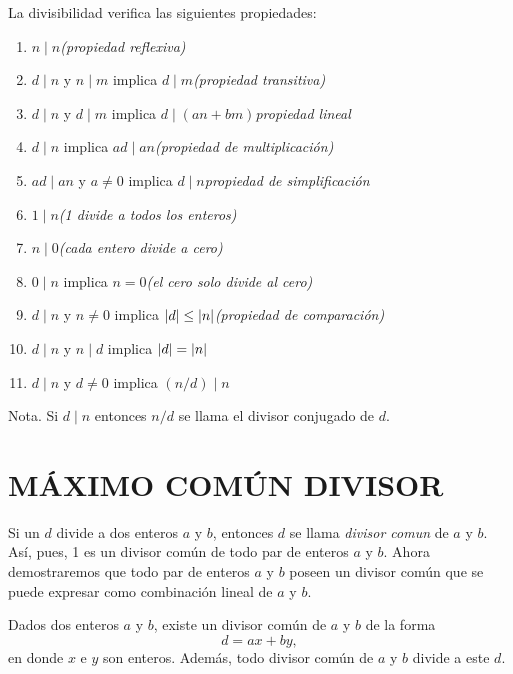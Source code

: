 \documentclass[12pt,a4paper]{book}
\begin{document}
    \begin{teorema}
        La divisibilidad verifica las siguientes propiedades:
        \begin{enumerate}
            \item[(a)] $n\mid n$\hfill \textit{(propiedad reflexiva)}
            \item[(b)] $d\mid n$ y $n\mid m$ implica $d\mid m$\hfill\textit{(propiedad transitiva)}
            \item[(c)] $d\mid n$ y $d\mid m$ implica $d\mid(an+bm)$\hfill\textit{propiedad lineal}
            \item[(d)] $d\mid n$ implica $ad\mid an$\hfill\textit{(propiedad de multiplicación)}
            \item[(e)] $ad\mid an$ y $a\neq0$ implica $d\mid n$\hfill\textit{propiedad de simplificación}
            \item[(f)] $1\mid n$\hfill\textit{(1 divide a todos los enteros)}
            \item[(g)] $n\mid0$\hfill\textit{(cada entero divide a cero)}
            \item[(h)] $0\mid n$ implica $n=0$\hfill\textit{(el cero solo divide al cero)}
            \item[(i)] $d\mid n$ y $n\neq0$ implica $\abs{d}\leq\abs{n}$\hfill\textit{(propiedad de comparación)}
            \item[(j)] $d\mid n$ y $n\mid d$ implica $\abs{d}=\abs{n}$
            \item[(k)] $d\mid n$ y $d\neq0$ implica $(n/d)\mid n$
        \end{enumerate}
    \end{teorema}

    Nota. Si $d\mid n$ entonces $n/d$ se llama el divisor conjugado de $d$.

    \section{MÁXIMO COMÚN DIVISOR}

    Si un $d$ divide a dos enteros $a$ y $b$, entonces $d$ se llama \textit{divisor comun}
    de $a$ y $b$. Así, pues, 1 es un divisor común de todo par de enteros $a$ y $b$. Ahora
    demostraremos que todo par de enteros $a$ y $b$ poseen un divisor común que se puede expresar
    como combinación lineal de $a$ y $b$.

    \begin{teorema}
        Dados dos enteros $a$ y $b$, existe un divisor común de $a$ y $b$ de la forma
        \begin{equation*}
            d=ax+by,
        \end{equation*}
        en donde $x$ e $y$ son enteros. Además, todo divisor común de $a$ y $b$ divide a este
        $d$. 
    \end{teorema}
\end{document}
